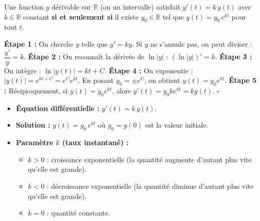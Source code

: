 \documentclass[11pt]{article}
\newcommand{\cle}[1]{{\popxbold\color{popdark}#1}}
\begin{document}
\begin{propriete}
Une fonction $y$ dérivable sur $\mathbb{R}$ (ou un intervalle) satisfait $y'(t) = k \, y(t)$ avec $k \in \mathbb{R}$ constant \textbf{si et seulement si} il existe $y_0 \in \mathbb{R}$ tel que $y(t) = y_0 \, e^{kt}$ pour tout $t$.
\end{propriete}

\begin{experience}
\textbf{Étape 1 :} On cherche $y$ telle que $y' = ky$. Si $y$ ne s'annule pas, on peut diviser : $\dfrac{y'}{y} = k$.
\textbf{Étape 2 :} On reconnaît la dérivée de $\ln|y|$ : $(\ln|y|)' = k$.
\textbf{Étape 3 :} On intègre : $\ln|y(t)| = kt + C$.
\textbf{Étape 4 :} On exponentie : $|y(t)| = e^{kt+C} = e^C e^{kt}$. En posant $y_0 = \pm e^C$, on obtient $y(t) = y_0 e^{kt}$.
\textbf{Étape 5 :} Réciproquement, si $y(t) = y_0 e^{kt}$, alors $y'(t) = y_0 k e^{kt} = k y(t)$. \hfill $\square$
\end{experience}

\begin{propriete}
\begin{itemize}
    \item \textbf{Équation différentielle :} $y'(t) = k \, y(t)$.
    \item \textbf{Solution :} $y(t) = y_0 \, e^{kt}$ où $y_0 = y(0)$ est la valeur initiale.
    \item \textbf{Paramètre $k$ (taux instantané) :}
    \begin{itemize}
        \item $k > 0$ : \cle{croissance exponentielle} (la quantité augmente d'autant plus vite qu'elle est grande).
        \item $k < 0$ : \cle{décroissance exponentielle} (la quantité diminue d'autant plus vite qu'elle est grande).
        \item $k = 0$ : quantité constante.
    \end{itemize}
\end{itemize}
\end{propriete}
\end{document}
